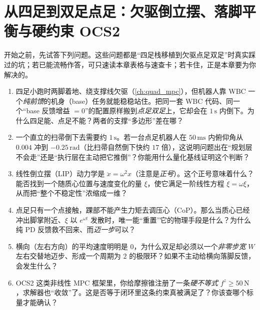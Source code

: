 \chapter{从四足到双足点足：欠驱倒立摆、落脚平衡与硬约束 OCS2}
\label{ch:legged-biped}


\begin{practice}[前置自测]
开始之前，先试答下列问题。这些问题都是“四足栈移植到欠驱点足双足”时真实踩过的坑；若已能流畅作答，可只速读本章表格与速查卡；若卡住，正是本章要为你解决的。
\begin{enumerate}
  \item 四足小跑时两脚着地、绕支撑线欠驱（\cref{ch:quad_mpc}），但机器人靠 WBC 一个\emph{纯前馈}的机身（base）任务就能稳稳站住。把同一套 WBC 代码、同一个“base 反馈增益 $=0$”的配置原样搬到\emph{点足双足}上，它却会在 $1\,\mathrm{s}$ 内倒下。为什么四足能、点足不能？两者的支撑“多边形”差在哪？
  \item 一个直立的扫帚倒下去需要约 $1\,\mathrm{s}$。若一台点足机器人在 $50\,\mathrm{ms}$ 内俯仰角从 $0.004$ 冲到 $-0.25\,\mathrm{rad}$（比扫帚自然倒下快约 $17$ 倍），这说明问题出在“规划层不会走”还是“执行层在主动把它推倒”？你能用什么量化基线证明这个判断？
  \item 线性倒立摆（LIP）动力学是 $\ddot{x}=\omega^2 x$（注意是\emph{正号}）。这个正号意味着什么？能否找到一个随质心位置与速度变化的量 $\xi$，使它满足一阶线性方程 $\dot\xi=\omega\xi$，从而把“整个不稳定性”浓缩成一维？
  \item 点足只有一个点接触，踝部不能产生力矩去调压心（CoP）。那么当质心已经冲出脚掌附近、$\xi$ 以 $e^{\omega t}$ 发散时，唯一能“重置”它的物理手段是什么？为什么纯 PD 反馈救不回来、而\emph{迈一步}可以？
  \item 横向（左右方向）的平均速度明明是 $0$，为什么双足却必须以一个\emph{非零步宽} $W$ 左右交替地迈步、形成一个周期为 $2$ 的极限环？如果不主动给横向落脚反馈，会发生什么？
  \item OCS2 这类非线性 MPC 框架里，你给摩擦锥注册了一条\emph{硬不等式} $f^z\ge 50\,\mathrm{N}$，求解器也“收敛”了。这是否等于闭环里这条约束真被满足了？你该查哪个标量才能确认？
\end{enumerate}
\end{practice}

